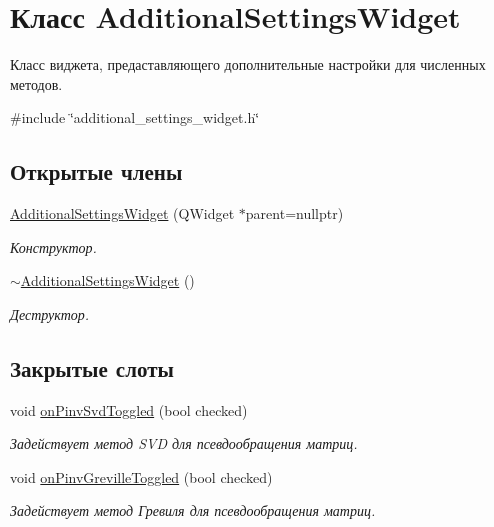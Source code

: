 \hypertarget{class_additional_settings_widget}{}\section{Класс Additional\+Settings\+Widget}
\label{class_additional_settings_widget}


Класс виджета, предаставляющего дополнительные настройки для численных методов.  




{\ttfamily \#include \char`\"{}additional\+\_\+settings\+\_\+widget.\+h\char`\"{}}

\subsection*{Открытые члены}
\begin{DoxyCompactItemize}
\item 
\hyperlink{class_additional_settings_widget_a77a6ec05e073b3710fd6dd3651c5ba2c}{Additional\+Settings\+Widget} (Q\+Widget $\ast$parent=nullptr)\hypertarget{class_additional_settings_widget_a77a6ec05e073b3710fd6dd3651c5ba2c}{}\label{class_additional_settings_widget_a77a6ec05e073b3710fd6dd3651c5ba2c}

\begin{DoxyCompactList}\small\item\em Конструктор. \end{DoxyCompactList}\item 
\hyperlink{class_additional_settings_widget_a375c84f23821d01d91289b57daa098a5}{$\sim$\+Additional\+Settings\+Widget} ()\hypertarget{class_additional_settings_widget_a375c84f23821d01d91289b57daa098a5}{}\label{class_additional_settings_widget_a375c84f23821d01d91289b57daa098a5}

\begin{DoxyCompactList}\small\item\em Деструктор. \end{DoxyCompactList}\end{DoxyCompactItemize}
\subsection*{Закрытые слоты}
\begin{DoxyCompactItemize}
\item 
void \hyperlink{class_additional_settings_widget_a18833f1a993762babf170e952074cf50}{on\+Pinv\+Svd\+Toggled} (bool checked)
\begin{DoxyCompactList}\small\item\em Задействует метод S\+VD для псевдообращения матриц. \end{DoxyCompactList}\item 
void \hyperlink{class_additional_settings_widget_ae1174df17848122030d877a75ce5dd7d}{on\+Pinv\+Greville\+Toggled} (bool checked)
\begin{DoxyCompactList}\small\item\em Задействует метод Гревиля для псевдообращения матриц. \end{DoxyCompactList}\end{DoxyCompactItemize}
